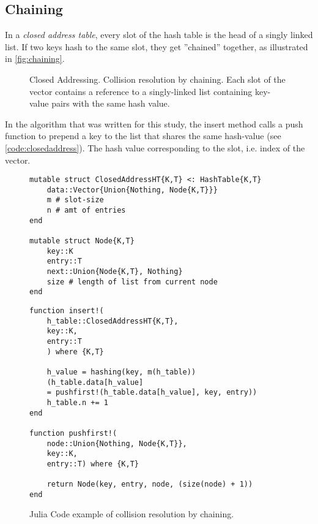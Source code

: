 \documentclass[a4paper, 11pt]{article}
\def\LinkedList#1{%
  \foreach \element in \list {
     \node[node of list, right = of aux, name=ele] {\element};
     \node[node of list, name=aux2, anchor=west] at ([xshift=-.4pt] ele.east) {};
     \draw[link] (aux) -- (ele);
     \coordinate (aux) at (aux2);
   }
   \fill (aux) circle(2pt);
}
\begin{document}
    \subsection*{Chaining}
    In a \emph{closed address table}, every slot of the hash table is the head
    of a singly linked list. If two keys hash to the same slot, they 
    get ''chained'' together, as illustrated in \autoref{fig:chaining}. 

    \begin{figure}[h]
    \caption{Closed Addressing.
Collision resolution by chaining. Each slot of the vector contains a reference
to a singly-linked list containing
key-value pairs with the same hash value.}
    \label{fig:chaining}
    \end{figure}

    In the algorithm that was written for this study,
    the insert method calls a push function to prepend 
    a key to the list that shares the same hash-value (see \autoref{code:closedaddress}).
    The hash value corresponding to the slot, i.e. index of the vector. 

    \begin{figure}[h]
        \centering
    \begin{verbatim}
mutable struct ClosedAddressHT{K,T} <: HashTable{K,T}
    data::Vector{Union{Nothing, Node{K,T}}}
    m # slot-size
    n # amt of entries
end

mutable struct Node{K,T}
    key::K
    entry::T
    next::Union{Node{K,T}, Nothing}
    size # length of list from current node
end
    \end{verbatim}
    \begin{verbatim}
function insert!(
    h_table::ClosedAddressHT{K,T},
    key::K,
    entry::T
    ) where {K,T}

    h_value = hashing(key, m(h_table))
    (h_table.data[h_value] 
    = pushfirst!(h_table.data[h_value], key, entry))
    h_table.n += 1
end

function pushfirst!(
    node::Union{Nothing, Node{K,T}}, 
    key::K, 
    entry::T) where {K,T}

    return Node(key, entry, node, (size(node) + 1))
end
    \end{verbatim}
    \caption{Julia Code example of collision resolution by chaining.} %
    \label{code:closedaddress} %
    \end{figure}
\end{document}
